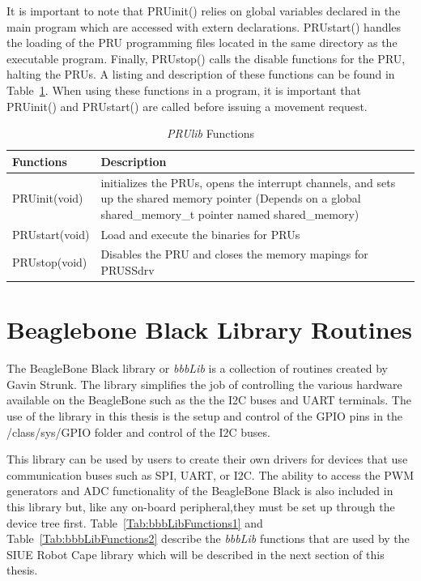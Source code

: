 \documentclass[12pt,oneside,final]{siuethesis}
\theoremstyle{definition}
\begin{document}
It is important to note that PRUinit() relies on global variables declared in the main program which are accessed with extern declarations. PRUstart() handles the loading of the PRU programming files located in the same directory as the executable program. Finally, PRUstop() calls the disable functions for the PRU, halting the PRUs. A listing and description of these functions can be found in Table~\ref{Tab:PRUlibFunctions}. When using  these functions in a program, it is important that PRUinit() and PRUstart() are called before issuing a movement request.

\begin{table}[!htb]
	\centering
    \begin{tabular}{ | l | p{10.5cm}|}
    	\hline
	Functions & Description  \\ \hline
	PRUinit(void) & initializes the PRUs, opens the interrupt channels, and sets up the shared memory pointer (Depends on a global shared\_memory\_t pointer named shared\_memory)  \\ \hline
	PRUstart(void) & Load and execute the binaries for PRUs \\ \hline
	PRUstop(void) &  Disables the PRU and closes the memory mapings for PRUSSdrv\\ \hline
    \end{tabular}
     \caption{\emph{PRUlib} Functions}
 	\label{Tab:PRUlibFunctions}
\end{table}

\section{Beaglebone Black Library Routines}

The BeagleBone Black library or \emph{bbbLib} is a collection of routines created by Gavin Strunk. The library simplifies the job of controlling the various hardware available on the BeagleBone such as the the I2C buses and UART terminals. The use of the library in this thesis is the setup and control of the GPIO pins in the /class/sys/GPIO folder and control of the I2C buses. 

This library can be used by users to create their own drivers for devices that use communication buses such as SPI, UART, or I2C. The ability to access the PWM generators and ADC functionality of the BeagleBone Black is also included in this library but, like any on-board peripheral,they must be set up through the device tree first. Table~\ref{Tab:bbbLibFunctions1} and Table~\ref{Tab:bbbLibFunctions2} describe the \emph{bbbLib} functions that are used by the SIUE Robot Cape library which will be described in the next section of this thesis. 
\end{document}

